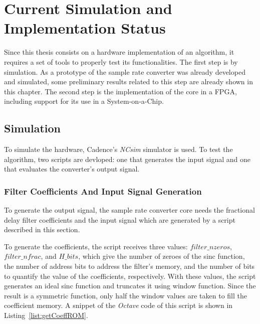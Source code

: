 
\chapter{Current Simulation and Implementation Status}

Since this thesis consists on a hardware implementation of an algorithm, it
requires a set of tools to properly test its functionalities. The first step is
by simulation. As a prototype of the sample rate converter was already developed
and simulated, some preliminary results related to this step are already shown
in this chapter. The second step is the implementation of the core in a FPGA,
including support for its use in a System-on-a-Chip.

\section{Simulation}
\label{section:sim}

To simulate the hardware, Cadence's \textit{NCsim} simulator is used. To test
the algorithm, two scripts are devloped: one that generates the input signal and
one that evaluates the converter's output signal.

\subsection{Filter Coefficients And Input Signal Generation}
\label{section:input_script}

To generate the output signal, the sample rate converter core needs the
fractional delay filter coefficients and the input signal which are generated by
a script described in this section.

To generate the coefficients, the script receives three values:
$filter\_nzeros$, $filter\_nfrac$, and $H\_bits$, which give the number of
zeroes of the sinc function, the number of address bits to address the filter's
memory, and the number of bits to quantify the value of the coefficients,
respectively. With these values, the script generates an ideal sinc function and
truncates it using window function. Since the result is a symmetric function,
only half the window values are taken to fill the coefficient memory. A snippet
of the \textit{Octave} code of this script is shown in
Listing~\ref{list:getCoeffROM}.

